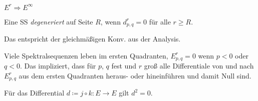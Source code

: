 \documentclass{cheat-sheet}
\newenvironment{centertikzcd}
  {\begin{center}\begin{tikzcd}}
  {\end{tikzcd}\end{center}}
\begin{document}
\begin{nota}
  $E^r \Rightarrow E^\infty$
\end{nota}

\begin{defn}
  Eine SS \emph{degeneriert} auf Seite $R$, wenn $d^r_{p,q} \!=\! 0$ für alle $r \!\geq\! R$.
\end{defn}

\begin{bem}
  Das entspricht der gleichmäßigen Konv. aus der Analysis.
\end{bem}

\begin{bem}
  Viele Spektralsequenzen leben im ersten Quadranten, \dh{} $E^r_{p,q} = 0$ wenn $p < 0$ oder $q < 0$. Das impliziert, dass für $p$, $q$ fest und $r$ groß alle Differentiale von und nach $E^r_{p,q}$ aus dem ersten Quadranten heraus- oder hineinführen und damit Null sind.
\end{bem}


\begin{bem}
  Für das Differential $d \coloneqq j \circ k : E \to E$ gilt $d^2 = 0$.
\end{bem}

\end{document}
